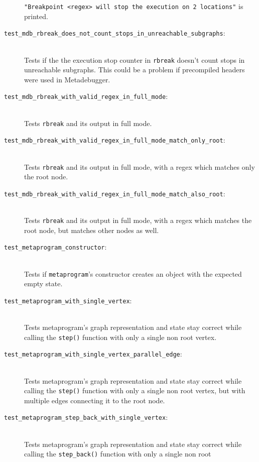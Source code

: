 \begin{description}
        \texttt{"Breakpoint <regex> will stop the execution on 2 locations"} is
        printed.
    \item[\texttt{test\_mdb\_rbreak\_does\_not\_count\_stops\_in\_unreachable\_subgraphs}:] \hfill \\
        Tests if the the execution stop counter in \texttt{rbreak} doesn't count
        stops in unreachable subgraphs. This could be a problem if precompiled
        headers were used in Metadebugger.
    \item[\texttt{test\_mdb\_rbreak\_with\_valid\_regex\_in\_full\_mode}:] \hfill \\
        Tests \texttt{rbreak} and its output in full mode.
    \item[\texttt{test\_mdb\_rbreak\_with\_valid\_regex\_in\_full\_mode\_match\_only\_root}:] \hfill \\
        Tests \texttt{rbreak} and its output in full mode, with a regex which
        matches only the root node.
    \item[\texttt{test\_mdb\_rbreak\_with\_valid\_regex\_in\_full\_mode\_match\_also\_root}:] \hfill \\
        Tests \texttt{rbreak} and its output in full mode, with a regex which
        matches the root node, but matches other nodes as well.
    \item[\texttt{test\_metaprogram\_constructor}:] \hfill \\
        Tests if \texttt{metaprogram}'s constructor creates an object
        with the expected empty state.
    \item[\texttt{test\_metaprogram\_with\_single\_vertex}:] \hfill \\
        Tests metaprogram's graph representation and state stay correct while
        calling the \texttt{step()} function with only a single non root
        vertex.
    \item[\texttt{test\_metaprogram\_with\_single\_vertex\_parallel\_edge}:] \hfill \\
        Tests metaprogram's graph representation and state stay correct while
        calling the \texttt{step()} function with only a single non root
        vertex, but with multiple edges connecting it to the root node.
    \item[\texttt{test\_metaprogram\_step\_back\_with\_single\_vertex}:] \hfill \\
        Tests metaprogram's graph representation and state stay correct while
        calling the \texttt{step\_back()} function with only a single non root

\end{description}
